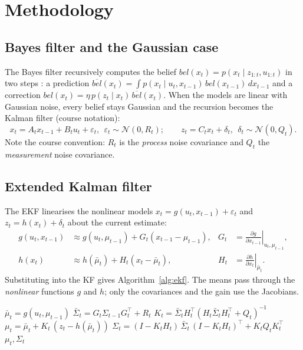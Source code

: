 \documentclass[11pt]{article}
\begin{document}
\section{Methodology}
\subsection{Bayes filter and the Gaussian case}
The Bayes filter recursively computes the belief $bel(x_t)=p(x_t\mid z_{1:t},u_{1:t})$ in two steps \cite{thrun2005}: a prediction $\overline{bel}(x_t)=\int p(x_t\mid u_t,x_{t-1})\,bel(x_{t-1})\,dx_{t-1}$ and a correction $bel(x_t)=\eta\,p(z_t\mid x_t)\,\overline{bel}(x_t)$. When the models are linear with Gaussian noise, every belief stays Gaussian and the recursion becomes the Kalman filter (course notation):
\begin{equation}
x_t = A_t x_{t-1}+B_t u_t+\varepsilon_t,\ \ \varepsilon_t\sim\mathcal N(0,R_t);\qquad z_t=C_t x_t+\delta_t,\ \ \delta_t\sim\mathcal N(0,Q_t).
\end{equation}
Note the course convention: $R_t$ is the \emph{process} noise covariance and $Q_t$ the \emph{measurement} noise covariance.

\subsection{Extended Kalman filter}
The EKF linearises the nonlinear models $x_t=g(u_t,x_{t-1})+\varepsilon_t$ and $z_t=h(x_t)+\delta_t$ about the current estimate:
\begin{align}
g(u_t,x_{t-1})&\approx g(u_t,\mu_{t-1})+G_t(x_{t-1}-\mu_{t-1}), & G_t&=\left.\frac{\partial g}{\partial x_{t-1}}\right|_{u_t,\mu_{t-1}},\\
h(x_t)&\approx h(\bar\mu_t)+H_t(x_t-\bar\mu_t), & H_t&=\left.\frac{\partial h}{\partial x_t}\right|_{\bar\mu_t}.
\end{align}
Substituting into the KF gives Algorithm~\ref{alg:ekf}. The means pass through the \emph{nonlinear} functions $g$ and $h$; only the covariances and the gain use the Jacobians.

\begin{algorithm}[h]
\caption{Extended\_Kalman\_filter$(\mu_{t-1},\Sigma_{t-1},u_t,z_t)$ (as in the lecture notes)}\label{alg:ekf}
\begin{algorithmic}[1]
\State $\bar\mu_t = g(u_t,\mu_{t-1})$ 
\State $\bar\Sigma_t = G_t\Sigma_{t-1}G_t^\top + R_t$
\State $K_t = \bar\Sigma_t H_t^\top (H_t\bar\Sigma_t H_t^\top + Q_t)^{-1}$ 
\State $\mu_t = \bar\mu_t + K_t\,(z_t - h(\bar\mu_t))$ 
\State $\Sigma_t = (I-K_tH_t)\,\bar\Sigma_t\,(I-K_tH_t)^\top + K_tQ_tK_t^\top$ 
\State \Return $\mu_t,\Sigma_t$
\end{algorithmic}
\end{algorithm}
\end{document}

